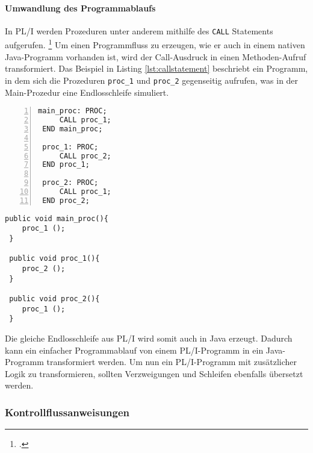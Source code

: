 \paragraph*{Umwandlung des Programmablaufs}

In PL/I werden Prozeduren unter anderem mithilfe des \verb+CALL+ Statements aufgerufen. \footcite[Vgl. ][S.133ff. ]{pliref} Um einen Programmfluss zu erzeugen, wie er auch in einem nativen Java-Programm vorhanden ist, wird der Call-Ausdruck in einen Methoden-Aufruf transformiert. 
Das Beispiel in Listing \ref{lst:callstatement} beschriebt ein Programm, in dem sich die Prozeduren \verb+proc_1+ und \verb+proc_2+ gegenseitig aufrufen, was in der Main-Prozedur eine Endlosschleife simuliert.

\begin{minipage}[b]{0.48\linewidth}
	\centering
	\lstset{language=PL/I,label=SliceExaple}
	\begin{lstlisting}[frame=single, numbers=left, mathescape,%
		caption={Transformation Prozeduraufrufe}, label={lst:callstatement},
		basicstyle=\fontsize{9}{13}\selectfont\ttfamily]
 main_proc: PROC;
	 CALL proc_1;
 END main_proc;
		
 proc_1: PROC;
	 CALL proc_2;
 END proc_1;
		
 proc_2: PROC;
	 CALL proc_1;
 END proc_2;
	\end{lstlisting}
\end{minipage}
\hspace{0.5cm}
\begin{minipage}[b]{0.48\linewidth}
	\centering
	\lstset{language=Java,label=SliceExaple}
	\begin{lstlisting}[frame=single, mathescape,%
		title={" "},
		basicstyle=\fontsize{9}{13}\selectfont\ttfamily]
 public void main_proc(){
 	proc_1 ();
 }
		
 public void proc_1(){
	proc_2 ();
 }
		
 public void proc_2(){
	proc_1 ();
 }
	\end{lstlisting}
\end{minipage}


Die gleiche Endlosschleife aus PL/I wird somit auch in Java erzeugt.
Dadurch kann ein einfacher Programmablauf von einem PL/I-Programm in ein Java-Programm transformiert werden.
Um nun ein PL/I-Programm mit zusätzlicher Logik zu transformieren, sollten Verzweigungen und Schleifen ebenfalls übersetzt werden.

\pagebreak
\subsubsection{Kontrollflussanweisungen}

